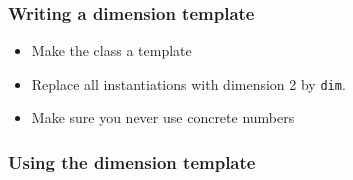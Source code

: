 \begin{frame}[fragile]
  \frametitle{Writing a dimension template}
  \begin{itemize}
  \item Make the class a template
    \begin{block}{}
    \end{block}
  \item<3-> Replace all instantiations with dimension 2 by
    \lstinline!dim!.
    \begin{block}{}      
      \only<3>{}
    \end{block}
  \item<5-> Make sure you never use concrete numbers
    \begin{block}{}
      \only<5>{}
    \end{block}
  \end{itemize}
\end{frame}

\begin{frame}[fragile]
  \frametitle{Using the dimension template}
  \begin{block}{}
        
  \end{block}
\end{frame}

